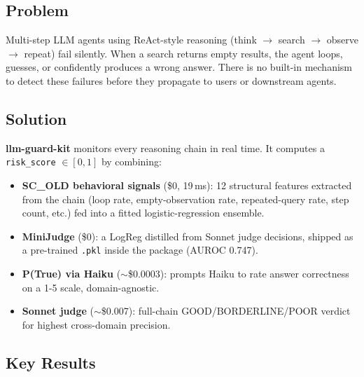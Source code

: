 \documentclass[11pt,a4paper]{article}
\begin{document}
\subsection*{Problem}

Multi-step LLM agents using ReAct-style reasoning (think $\to$ search $\to$ observe $\to$
repeat) fail silently. When a search returns empty results, the agent loops, guesses,
or confidently produces a wrong answer. There is no built-in mechanism to detect
these failures before they propagate to users or downstream agents.

\subsection*{Solution}

\textbf{llm-guard-kit} monitors every reasoning chain in real time. It computes a
\texttt{risk\_score} $\in [0,1]$ by combining:
\begin{itemize}
  \item \textbf{SC\_OLD behavioral signals} (\$0, 19\,ms): 12 structural features
        extracted from the chain (loop rate, empty-observation rate, repeated-query
        rate, step count, etc.) fed into a fitted logistic-regression ensemble.
  \item \textbf{MiniJudge} (\$0): a LogReg distilled from Sonnet judge decisions,
        shipped as a pre-trained \texttt{.pkl} inside the package (AUROC 0.747).
  \item \textbf{P(True) via Haiku} ($\sim$\$0.0003): prompts Haiku to rate answer
        correctness on a 1-5 scale, domain-agnostic.
  \item \textbf{Sonnet judge} ($\sim$\$0.007): full-chain GOOD/BORDERLINE/POOR
        verdict for highest cross-domain precision.
\end{itemize}

\subsection*{Key Results}

\begin{table}[h]
\centering
{}
\caption{Validated performance on held-out evaluation sets. Within-domain = HotpotQA
(200 chains). Cross-domain = TriviaQA n=1000, 2WikiMultiHop n=200.}
\end{table}
\end{document}
